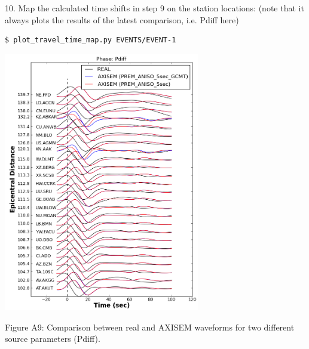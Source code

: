 \documentclass{article}
\begin{document}
\vspace{13pt}
10. Map the calculated time shifts in step 9 on the station locations: (note that 
it always plots the results of the latest comparison, i.e. Pdiff here) 

\begin{verbatim}
$ plot_travel_time_map.py EVENTS/EVENT-1
\end{verbatim}

\begin{center}
\includegraphics[width=242pt, height=322pt, keepaspectratio=true]{AXISEMTutorial-fig015.png}

{\small{}Figure A9: Comparison between real and AXISEM waveforms for two different 
source parameters (Pdiff).}


\end{center}
\end{document}

